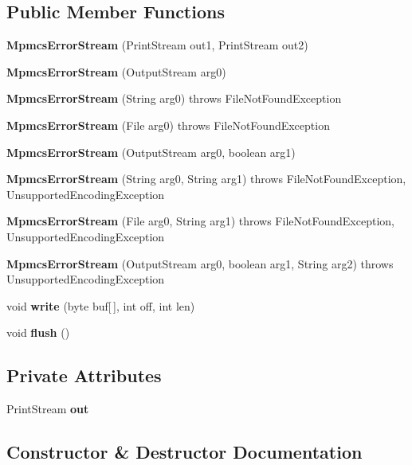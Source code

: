 \subsection*{Public Member Functions}
\begin{DoxyCompactItemize}
\item 
{\bf Mpmcs\+Error\+Stream} (Print\+Stream out1, Print\+Stream out2)
\item 
{\bf Mpmcs\+Error\+Stream} (Output\+Stream arg0)
\item 
{\bf Mpmcs\+Error\+Stream} (String arg0)  throws File\+Not\+Found\+Exception 
\item 
{\bf Mpmcs\+Error\+Stream} (File arg0)  throws File\+Not\+Found\+Exception 
\item 
{\bf Mpmcs\+Error\+Stream} (Output\+Stream arg0, boolean arg1)
\item 
{\bf Mpmcs\+Error\+Stream} (String arg0, String arg1)  throws File\+Not\+Found\+Exception, Unsupported\+Encoding\+Exception 
\item 
{\bf Mpmcs\+Error\+Stream} (File arg0, String arg1)  throws File\+Not\+Found\+Exception, Unsupported\+Encoding\+Exception 
\item 
{\bf Mpmcs\+Error\+Stream} (Output\+Stream arg0, boolean arg1, String arg2)  throws Unsupported\+Encoding\+Exception 
\item 
void {\bf write} (byte buf[$\,$], int off, int len)
\item 
void {\bf flush} ()
\end{DoxyCompactItemize}
\subsection*{Private Attributes}
\begin{DoxyCompactItemize}
\item 
Print\+Stream {\bf out}
\end{DoxyCompactItemize}


\subsection{Constructor \& Destructor Documentation}
